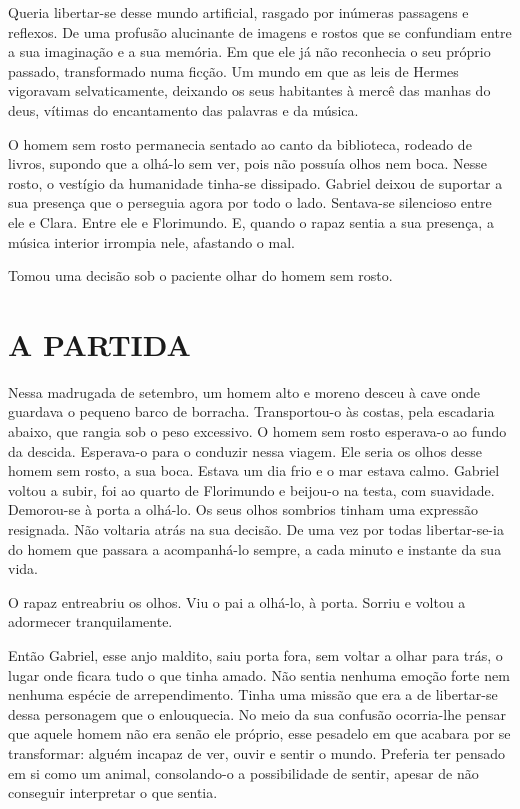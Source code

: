 Queria libertar-se desse mundo artificial, rasgado por inúmeras
passagens e reflexos. De uma profusão alucinante de imagens e rostos que
se confundiam entre a sua imaginação e a sua memória. Em que ele já não
reconhecia o seu próprio passado, transformado numa ficção. Um mundo em
que as leis de Hermes vigoravam selvaticamente, deixando os seus
habitantes à mercê das manhas do deus, vítimas do encantamento das
palavras e da música.

O homem sem rosto permanecia sentado ao canto da biblioteca, rodeado de
livros, supondo que a olhá-lo sem ver, pois não possuía olhos nem boca.
Nesse rosto, o vestígio da humanidade tinha-se dissipado. Gabriel deixou
de suportar a sua presença que o perseguia agora por todo o lado.
Sentava-se silencioso entre ele e Clara. Entre ele e Florimundo. E,
quando o rapaz sentia a sua presença, a música interior irrompia nele,
afastando o mal.

Tomou uma decisão sob o paciente olhar do homem sem rosto.


\section{A PARTIDA}

Nessa madrugada de setembro, um homem alto e moreno desceu à cave onde
guardava o pequeno barco de borracha. Transportou-o às costas, pela
escadaria abaixo, que rangia sob o peso excessivo. O homem sem rosto
esperava-o ao fundo da descida. Esperava-o para o conduzir nessa viagem.
Ele seria os olhos desse homem sem rosto, a sua boca. Estava um dia frio
e o mar estava calmo. Gabriel voltou a subir, foi ao quarto de
Florimundo e beijou-o na testa, com suavidade. Demorou-se à porta a
olhá-lo. Os seus olhos sombrios tinham uma expressão resignada. Não
voltaria atrás na sua decisão. De uma vez por todas libertar-se-ia do
homem que passara a acompanhá-lo sempre, a cada minuto e instante da sua
vida.

O rapaz entreabriu os olhos. Viu o pai a olhá-lo, à porta. Sorriu e
voltou a adormecer tranquilamente.

Então Gabriel, esse anjo maldito, saiu porta fora, sem voltar a olhar
para trás, o lugar onde ficara tudo o que tinha amado. Não sentia
nenhuma emoção forte nem nenhuma espécie de arrependimento. Tinha uma
missão que era a de libertar-se dessa personagem que o enlouquecia. No
meio da sua confusão ocorria-lhe pensar que aquele homem não era senão
ele próprio, esse pesadelo em que acabara por se transformar: alguém
incapaz de ver, ouvir e sentir o mundo. Preferia ter pensado em si como
um animal, consolando-o a possibilidade de sentir, apesar de não
conseguir interpretar o que sentia.

